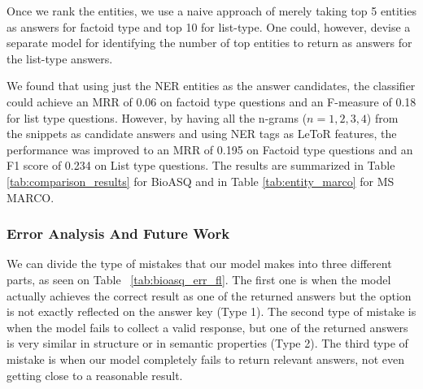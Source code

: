

Once we rank the entities, we use a naive approach of merely taking top 5 entities as answers for factoid type and top 10 for list-type. One could, however, devise a separate model for identifying the number of top entities to return as answers for the list-type answers. 

We found that using just the NER entities as the answer candidates, the classifier could achieve an MRR of 0.06 on factoid type questions and an F-measure of 0.18 for list type questions. However, by having all the n-grams ($n = 1, 2, 3, 4$) from the snippets as candidate answers and using NER tags as LeToR features, the performance was improved to an MRR of 0.195 on Factoid type questions and an F1 score of 0.234  on List type questions. The results are summarized in Table \ref{tab:comparison_results} for BioASQ and in Table \ref{tab:entity_marco} for MS MARCO.


\subsubsection{Error Analysis And Future Work}

We can divide the type of mistakes that our model makes into three different parts, as seen on Table ~\ref{tab:bioasq_err_fl}. The first one is when the model actually achieves the correct result as one of the returned answers but the option is not exactly reflected on the answer key (Type 1). The second type of mistake is when the model fails to collect a valid response, but one of the returned answers is very similar in structure or in semantic properties (Type 2). The third type of mistake is when our model completely fails to return relevant answers, not even getting close to a reasonable result.

